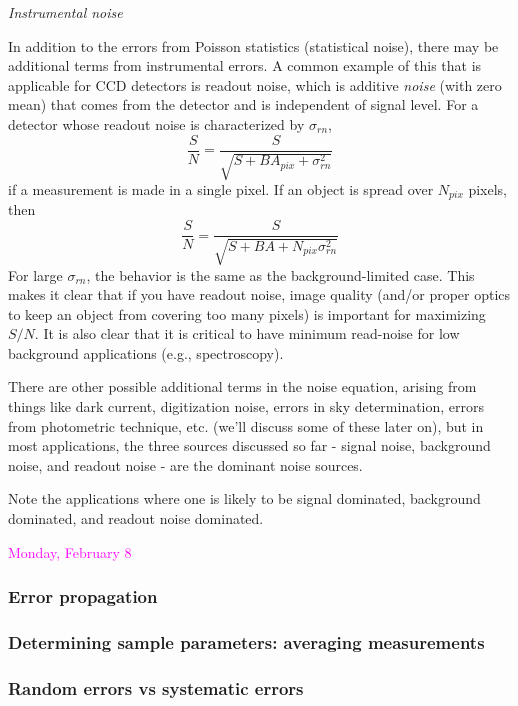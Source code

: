 \documentclass[12pt]{article}
\begin{document}
\emph{Instrumental noise}

In addition to the errors from Poisson statistics (statistical noise),
there may be additional terms from instrumental errors. A common
example of this that is applicable for CCD detectors is readout noise,
which is additive \emph{noise} (with zero mean) that comes from the detector
and is independent of signal level. For a detector whose readout noise
is characterized by $\sigma_{rn}$,
$$ \frac{S}{N} = \frac{S}{\sqrt{S+BA_{pix}+\sigma^2_{rn}}} $$
if a measurement is made in a single pixel. If an object is spread
over $N_{pix}$ pixels, then
$$ \frac{S}{N} = \frac{S}{\sqrt{S+BA+N_{pix}\sigma^2_{rn}}} $$
For large $\sigma_{rn}$, the behavior is the same as the
background-limited case. This makes it clear that if you have readout
noise, image quality (and/or proper optics to keep an object from
covering too many pixels) is important for maximizing $S/N$. It is
also clear that it is critical to have minimum read-noise for low
background applications (e.g., spectroscopy).

There are other possible additional terms in the noise equation,
arising from things like dark current, digitization noise, errors in
sky determination, errors from photometric technique, etc. (we'll
discuss some of these later on), but in most applications, the three
sources discussed so far - signal noise, background noise, and readout
noise - are the dominant noise sources.

Note the applications where one is likely to be signal dominated,
background dominated, and readout noise dominated.

\textcolor{magenta}{Monday, February 8}

\subsubsection*{Error propagation}
\subsubsection*{Determining sample parameters: averaging measurements}
\subsubsection*{Random errors vs systematic errors}
\end{document}
